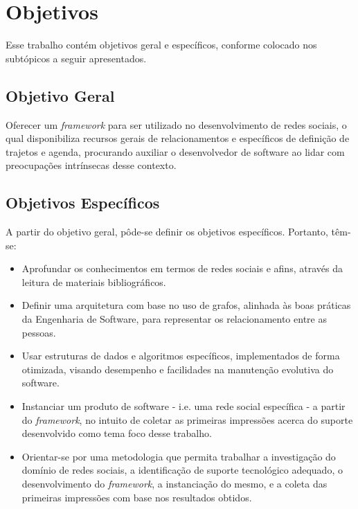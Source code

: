 \section{Objetivos}

Esse trabalho contém objetivos geral e específicos, conforme colocado nos subtópicos a seguir apresentados.

\subsection{Objetivo Geral}

Oferecer um \textit{framework} para ser utilizado no desenvolvimento de redes sociais, o qual disponibiliza recursos gerais de relacionamentos e específicos de definição de trajetos e agenda, procurando auxiliar o desenvolvedor de software ao lidar com preocupações intrínsecas desse contexto.

\subsection{Objetivos Específicos}

A partir do objetivo geral, pôde-se definir os objetivos específicos. Portanto, têm-se:

\begin{itemize}
	\item Aprofundar os conhecimentos em termos de redes sociais e afins, através da leitura de materiais bibliográficos.
	\item Definir uma arquitetura com base no uso de grafos, alinhada às boas práticas da Engenharia de Software, para representar os relacionamento entre as pessoas.
	\item Usar estruturas de dados e algoritmos específicos, implementados de forma otimizada, visando desempenho e facilidades na manutenção evolutiva do software.
	\item Instanciar um produto de software - i.e. uma rede social específica - a partir do \textit{framework}, no intuito de coletar as primeiras impressões acerca do suporte desenvolvido como tema foco desse trabalho.
	\item Orientar-se por uma metodologia que permita trabalhar a investigação do domínio de redes sociais, a identificação de suporte tecnológico adequado, o desenvolvimento do \textit{framework}, a instanciação do mesmo, e a coleta das primeiras impressões com base nos resultados obtidos.
\end{itemize}

